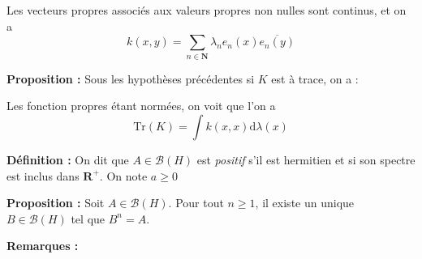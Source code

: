 \documentclass[12pt]{article}
\let\oldsum\sum
\renewcommand{\sum}{\oldsum\limits}
\begin{document}
Les vecteurs propres associés aux valeurs propres non nulles sont continus, et on a $$\boxed{ k(x,y) = \sum_{n \in \mathbf N} \lambda_n e_n(x) \overline{e_n(y)} } $$

\textbf{Proposition :} Sous les hypothèses précédentes si $K$ est à trace, on a :

Les fonction propres étant normées, on voit que l'on a $$ \mathrm{Tr}(K) = \int k(x,x) \mathrm d \lambda (x) $$


\textbf{Définition :} On dit que $A \in \mathcal B(H) $ est \textit{positif} s'il est hermitien et si son spectre est inclus dans $ \mathbf R^+ $. On note $ a \geqslant 0 $


\textbf{Proposition :} Soit $A \in \mathcal B(H) $. Pour tout $ n \geqslant 1 $, il existe un unique $ B \in \mathcal B(H) $ tel que $ B^n = A $.

\textbf{Remarques :} 
\end{document}
